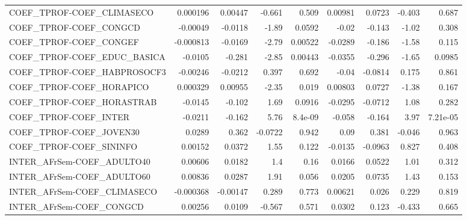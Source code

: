 \begin{tabular}{lrrrrrrrr}
COEF\_TPROF-COEF\_CLIMASECO              &    0.000196 &      0.00447 &   -0.661 &    0.509 &    0.00981 &      0.0723 &       -0.403 &         0.687 \\
COEF\_TPROF-COEF\_CONGCD                 &    -0.00049 &      -0.0118 &    -1.89 &   0.0592 &      -0.02 &      -0.143 &        -1.02 &         0.308 \\
COEF\_TPROF-COEF\_CONGEF                 &   -0.000813 &      -0.0169 &    -2.79 &  0.00522 &    -0.0289 &      -0.186 &        -1.58 &         0.115 \\
COEF\_TPROF-COEF\_EDUC\_BASICA            &     -0.0105 &       -0.281 &    -2.85 &  0.00443 &    -0.0355 &      -0.296 &        -1.65 &        0.0985 \\
COEF\_TPROF-COEF\_HABPROSOCF3            &    -0.00246 &      -0.0212 &    0.397 &    0.692 &      -0.04 &     -0.0814 &        0.175 &         0.861 \\
COEF\_TPROF-COEF\_HORAPICO               &    0.000329 &      0.00955 &    -2.35 &    0.019 &    0.00803 &      0.0727 &        -1.38 &         0.167 \\
COEF\_TPROF-COEF\_HORASTRAB              &     -0.0145 &       -0.102 &     1.69 &   0.0916 &    -0.0295 &     -0.0712 &         1.08 &         0.282 \\
COEF\_TPROF-COEF\_INTER                  &     -0.0211 &       -0.162 &     5.76 &  8.4e-09 &     -0.058 &      -0.164 &         3.97 &      7.21e-05 \\
COEF\_TPROF-COEF\_JOVEN30                &      0.0289 &        0.362 &  -0.0722 &    0.942 &       0.09 &       0.381 &       -0.046 &         0.963 \\
COEF\_TPROF-COEF\_SININFO                &     0.00152 &       0.0372 &     1.55 &    0.122 &    -0.0135 &     -0.0963 &        0.827 &         0.408 \\
INTER\_AFrSem-COEF\_ADULTO40             &     0.00606 &       0.0182 &      1.4 &     0.16 &     0.0166 &      0.0522 &         1.01 &         0.312 \\
INTER\_AFrSem-COEF\_ADULTO60             &     0.00836 &       0.0287 &     1.91 &    0.056 &     0.0205 &      0.0735 &         1.43 &         0.153 \\
INTER\_AFrSem-COEF\_CLIMASECO            &   -0.000368 &     -0.00147 &    0.289 &    0.773 &    0.00621 &       0.026 &        0.229 &         0.819 \\
INTER\_AFrSem-COEF\_CONGCD               &     0.00256 &       0.0109 &   -0.567 &    0.571 &     0.0302 &       0.123 &       -0.433 &         0.665 \\

\end{tabular}
